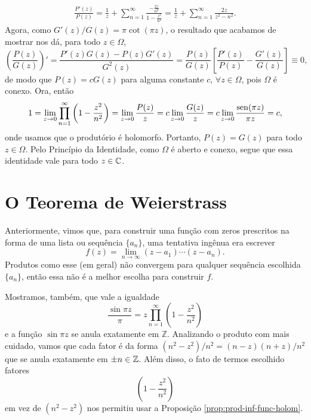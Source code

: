 \begin{exemplo}
        \begin{align*}
            \frac{P'(z)}{P(z)} =
            \frac{1}{z} + \sum_{n=1}^{\infty} \frac{ -\frac{2z}{n^2} }{ 1 - \frac{z^2}{n^2} }
            = \frac{1}{z} + \sum_{n=1}^{\infty} \frac{2z}{z^2 - n^2}.
        \end{align*}
        Agora, como $G'(z)/G(z) = \pi\cot(\pi z)$, o resultado que acabamos de mostrar
        nos dá, para todo $z\in\Omega$,
        \begin{equation*}
            \left( \frac{P(z)}{G(z)} \right)'
            = \frac{ P'(z)G(z) - P(z)G'(z) }{ G^2(z) }
            = \frac{P(z)}{G(z)}\left[ \frac{P'(z)}{P(z)} - \frac{G'(z)}{G(z)} \right]
            \equiv 0,
        \end{equation*}
        de modo que $P(z) = cG(z)$ para alguma constante $c, \, \forall z\in\Omega$,
        pois $\Omega$ é conexo. 
        Ora, então
        \begin{equation*}
            1 
            = \lim_{z\to 0} \prod_{n=1}^{\infty} \left( 1 - \frac{z^2}{n^2} \right)
            = \lim_{z\to 0} \frac{P(z)}{z} 
            = c\lim_{z\to 0} \frac{G(z)}{z}
            = c\lim_{z\to 0} \frac{\operatorname{sen}(\pi z)}{\pi z}
            = c,
        \end{equation*}
        onde usamos que o produtório é holomorfo.
        Portanto, $P(z) = G(z)$ para todo $z\in\Omega$. Pelo Princípio da Identidade,
        como $\Omega$ é aberto e conexo, segue que essa identidade vale para todo
        $z\in\mathbb{C}$.
    \end{exemplo}
    
    \section{O Teorema de Weierstrass}
    
    Anteriormente, vimos que, para construir uma função com zeros prescritos na forma de uma lista ou sequência $\{a_n\}$, uma tentativa ingênua era escrever
    $$ f(z) = \lim_{n \to \infty} (z-a_1) \cdots (z-a_n).$$
    Produtos como esse (em geral) não convergem para qualquer sequência escolhida $\{a_n\}$, então essa não é a melhor escolha para construir $f$. 
    
    Mostramos, também, que vale a igualdade 
    $$\frac{\sin{\pi z}}{\pi} = z \prod_{n = 1}^{\infty} \left(1 - \frac{z^2}{n^2}\right)$$
    e a função $\sin{\pi z}$ se anula exatamente em $\mathbb{Z}$. Analizando o produto com mais cuidado, vamos que cada fator é da forma $(n^2 - z^2)/n^2 = (n - z)(n + z)/n^2$ que se anula exatamente em $\pm n \in \mathbb{Z}$. Além disso, o fato de termos escolhido fatores 
    $$\left(1 - \frac{z^2}{n^2}\right)$$
    em vez de $(n^2 - z^2)$ nos permitiu usar a Proposição \ref{prop:prod-inf-func-holom}. 
    
